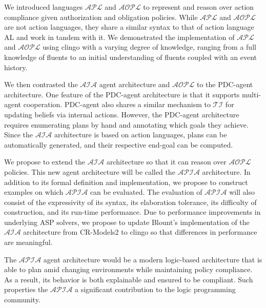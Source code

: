 We introduced languages $\mathcal{APL}$ and $\mathcal{AOPL}$ to represent and reason over action compliance given authorization and obligation policies.
While $\mathcal{APL}$ and $\mathcal{AOPL}$ are not action languages, they share a similar syntax to that of action language AL and work in tandem with it.
We demonstrated the implementation of $\mathcal{APL}$ and $\mathcal{AOPL}$ using clingo with a varying degree of knowledge, ranging from a full knowledge of fluents to an initial understanding of fluents coupled with an event history.

We then contrasted the $\mathcal{AIA}$ agent architecture and $\mathcal{AOPL}$ to the PDC-agent architecture.
One feature of the PDC-agent architecture is that it supports multi-agent cooperation.
PDC-agent also shares a similar mechanism to $\mathcal{TI}$ for updating beliefs via internal actions.
However, the PDC-agent architecture requires enumerating plans by hand and annotating which goals they achieve.
Since the $\mathcal{AIA}$ architecture is based on action languages, plans can be automatically generated, and their respective end-goal can be computed.

We propose to extend the $\mathcal{AIA}$ architecture so that it can reason over $\mathcal{AOPL}$ policies.
This new agent architecture will be called the $\mathcal{APIA}$ architecture.
In addition to its formal definition and implementation, we propose to construct examples on which $\mathcal{APIA}$ can be evaluated.
The evaluation of $\mathcal{APIA}$ will also consist of the expressivity of its syntax, its elaboration tolerance, its difficulty of construction, and its run-time performance.
Due to performance improvements in underlying ASP solvers, we propose to update Blount's implementation of the $\mathcal{AIA}$ architecture from CR-Models2 to clingo so that differences in performance are meaningful.

The $\mathcal{APIA}$ agent architecture would be a modern logic-based architecture that is able to plan amid changing environments while maintaining policy compliance.
As a result, its behavior is both explainable and ensured to be compliant.
Such properties the $\mathcal{APIA}$ a significant contribution to the logic programming community.
